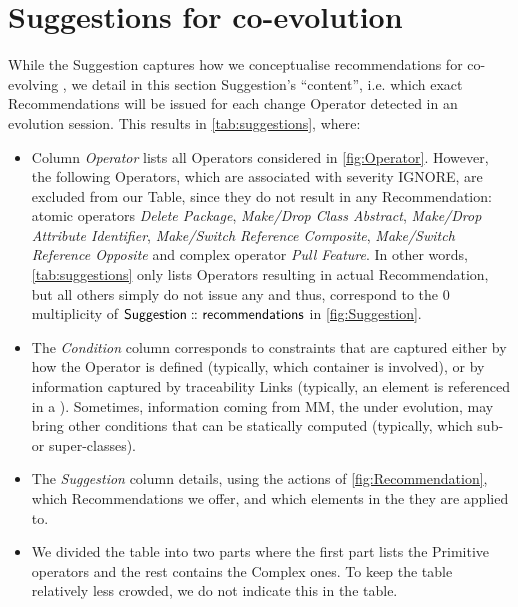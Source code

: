 \section{Suggestions for \viewtype co-evolution} 
\label{sec:Approach}

While the \textsf{Suggestion} \metamodel captures how we
conceptualise recommendations for co-evolving \viewtypes, we detail
in this section \textsf{Suggestion}'s ``content'', i.e. which exact \textsf{Recommendation}s
will be issued for each change \textsf{Operator} detected in an evolution
session. This results in \cref{tab:suggestions}, where:
\begin{itemize}
	\item Column \textsl{Operator} lists all \textsf{Operator}s considered in \cref{fig:Operator}. 
    However, the following \textsf{Operator}s, which are
	associated with severity \textsf{IGNORE}, are excluded from our Table, since 
	they do not result in any \textsf{Recommendation}: atomic operators \textit{Delete Package}, 
	\textit{Make/Drop Class Abstract}, \textit{Make/Drop Attribute Identifier}, 
	\textit{Make/Switch Reference Composite}, \textit{Make/Switch Reference Opposite}
	and complex operator \textit{Pull Feature}. In other words, \cref{tab:suggestions} only
	lists \textsf{Operator}s resulting in actual \textsf{Recommendation}, but all
	others simply do not issue any and thus, correspond to the \textsf{0} multiplicity
	of $\mathsf{Suggestion} \,\colon\!\!\!\colon \mathsf{recommendations}$ in \cref{fig:Suggestion}.
	
	\item The \textsl{Condition} column corresponds to constraints that are captured
	either by how the \textsf{Operator} is defined (typically, which \textsf{container}
	is involved), or by information captured by traceability \textsf{Link}s (typically,
	an element is referenced in a \viewtype). Sometimes, information coming from \textsf{MM},
	the \metamodel under evolution, may bring other conditions that can be statically
	computed (typically, which sub- or super-classes). 
	
	\item The \textsl{Suggestion} column details, using the actions of \cref{fig:Recommendation}, which \textsf{Recommendation}s we offer, and which elements in the \viewtype they are applied to.

    \item We divided the table into two parts where the first part lists the \textsf{Primitive} operators and the rest contains the \textsf{Complex} ones. To keep the table relatively less crowded, we do not indicate this in the table.
\end{itemize}

